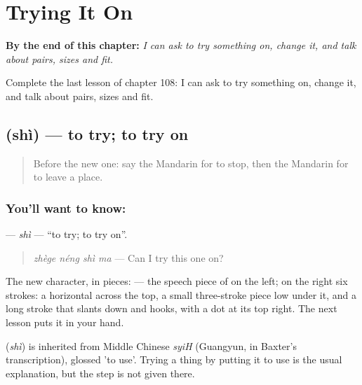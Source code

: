 
\chapter{Trying It On}
\label{ch:zh-trying-it-on}

\begin{chapteropening}
\textbf{By the end of this chapter:} \emph{I can ask to try something on, change it, and talk about pairs, sizes and fit.}

Complete the last lesson of chapter 108: I can ask to try something on, change it, and talk about pairs, sizes and fit.
\end{chapteropening}

\section[\texorpdfstring{\zh{试} (shì)}{试 (shì)}]{ (shì) — to try; to try on}

\label{lesson:ZH-C108-shi}



\begin{quote}
Before the new one: say the Mandarin for to stop, then the Mandarin for to leave a place.
\end{quote}

\subsection*{You'll want to know: }
\textbf{} — \emph{shì} — \textquotedblleft{}to try; to try on\textquotedblright{}.

\begin{quote}
\textbf{} \emph{zhège néng shì ma} — Can I try this one on?
\end{quote}

The new character, in pieces:  — the speech piece of  on the left; on the right six strokes: a horizontal across the top, a small three-stroke piece low under it, and a long stroke that slants down and hooks, with a dot at its top right. The next lesson puts it in your hand.

\begin{cousinweb}
\textbf{} (\emph{shì}) is inherited from Middle Chinese \emph{syiH} (Guangyun, in Baxter's transcription), glossed 'to use'. Trying a thing by putting it to use is the usual explanation, but the step is not given there.
\end{cousinweb}

